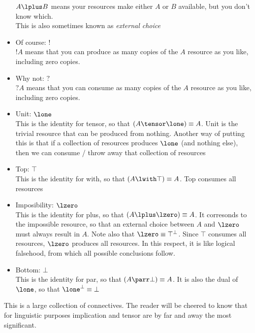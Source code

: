 \begin{itemize}
$A\lplus B$ means your resources make either $A$ or $B$ available, but you
don't know which.\\
This is also sometimes known as {\em external choice}
\item Of course: $!$\\
$!A$ means that you can produce as many copies of the $A$ resource as you like,
including zero copies.  
\item Why not: $?$\\
$?A$ means that you can consume as many copies of the $A$ resource as you like,
including zero copies.
\item Unit: $\lone$\\
This is the identity for tensor, so that 
$(A\tensor\lone)\equiv A$.  Unit is the trivial resource that can
be produced from nothing.  Another way of putting this is that if
a collection of resources produces $\lone$ (and nothing else), then we
can consume / throw away that collection of resources
\item Top: $\top$\\
This is the identity for with, so that $(A\lwith\top)\equiv A$.
Top consumes all resources
\item Imposibility: $\lzero$\\
This is the identity for plus, so that $(A\lplus\lzero) \equiv A$. It
corresonds to the impossible resource, so that an external choice
between $A$ and $\lzero$ must always result in $A$.  Note also that
$\lzero \equiv \top^{\bot}$.  Since $\top$ consumes all resources,
$\lzero$ produces all resources.  In this respect, it is like logical
falsehood, from which all possible conclusions follow.
\item Bottom: $\bot$\\
This is the identity for par, so that $(A\parr\bot)\equiv A$.  It is
also the dual of $\lone$, so that $\lone^{\bot}\equiv \bot$
\end{itemize}
This is a large collection of connectives.  The reader will be cheered
to know that for linguistic purposes implication and tensor are by far
and away the most significant.

